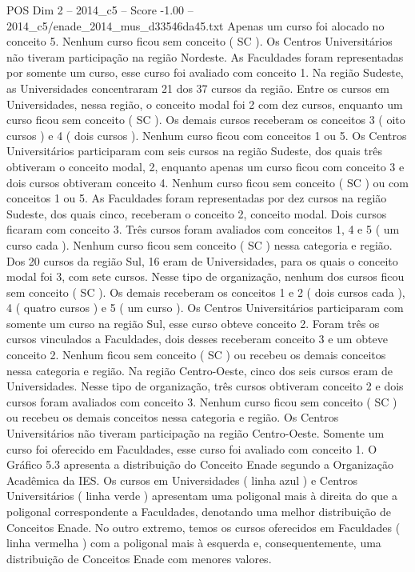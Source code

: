\begin{textsample}{POS Dim 2 – 2014\_c5 – Score -1.00 – 2014\_c5/enade\_2014\_mus\_d33546da45.txt}
Apenas um curso foi alocado no conceito 5.
Nenhum curso ficou sem conceito ( SC ).
Os Centros Universitários não tiveram participação na região Nordeste.
As Faculdades foram representadas por somente um curso, esse curso foi avaliado com conceito 1.
Na região Sudeste, as Universidades concentraram 21 dos 37 cursos da região.
Entre os cursos em Universidades, nessa região, o conceito modal foi 2 com dez cursos, enquanto um curso ficou sem conceito ( SC ).
Os demais cursos receberam os conceitos 3 ( oito cursos ) e 4 ( dois cursos ).
Nenhum curso ficou com conceitos 1 ou 5.
Os Centros Universitários participaram com seis cursos na região Sudeste, dos quais três obtiveram o conceito modal, 2, enquanto apenas um curso ficou com conceito 3 e dois cursos obtiveram conceito 4.
Nenhum curso ficou sem conceito ( SC ) ou com conceitos 1 ou 5.
As Faculdades foram representadas por dez cursos na região Sudeste, dos quais cinco, receberam o conceito 2, conceito modal.
Dois cursos ficaram com conceito 3.
Três cursos foram avaliados com conceitos 1, 4 e 5 ( um curso cada ).
Nenhum curso ficou sem conceito ( SC ) nessa categoria e região.
Dos 20 cursos da região Sul, 16 eram de Universidades, para os quais o conceito modal foi 3, com sete cursos.
Nesse tipo de organização, nenhum dos cursos ficou sem conceito ( SC ).
Os demais receberam os conceitos 1 e 2 ( dois cursos cada ), 4 ( quatro cursos ) e 5 ( um curso ).
Os Centros Universitários participaram com somente um curso na região Sul, esse curso obteve conceito 2.
Foram três os cursos vinculados a Faculdades, dois desses receberam conceito 3 e um obteve conceito 2.
Nenhum ficou sem conceito ( SC ) ou recebeu os demais conceitos nessa categoria e região.
Na região Centro-Oeste, cinco dos seis cursos eram de Universidades.
Nesse tipo de organização, três cursos obtiveram conceito 2 e dois cursos foram avaliados com conceito 3.
Nenhum curso ficou sem conceito ( SC ) ou recebeu os demais conceitos nessa categoria e região.
Os Centros Universitários não tiveram participação na região Centro-Oeste.
Somente um curso foi oferecido em Faculdades, esse curso foi avaliado com conceito 1.
O Gráfico 5.3 apresenta a distribuição do Conceito Enade segundo a Organização Acadêmica da IES.
Os cursos em Universidades ( linha azul ) e Centros Universitários ( linha verde ) apresentam uma poligonal mais à direita do que a poligonal correspondente a Faculdades, denotando uma melhor distribuição de Conceitos Enade.
No outro extremo, temos os cursos oferecidos em Faculdades ( linha vermelha ) com a poligonal mais à esquerda e, consequentemente, uma distribuição de Conceitos Enade com menores valores.

\end{textsample}
